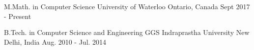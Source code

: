 \begin{cventries}
  \cveducation
    {M.Math. in Computer Science}
    {University of Waterloo}
    {Ontario, Canada}
    {Sept 2017 - Present}

  \cveducation
    {B.Tech. in Computer Science and Engineering}
    {GGS Indraprastha University}
    {New Delhi, India}
    {Aug. 2010 - Jul. 2014}

\end{cventries}
